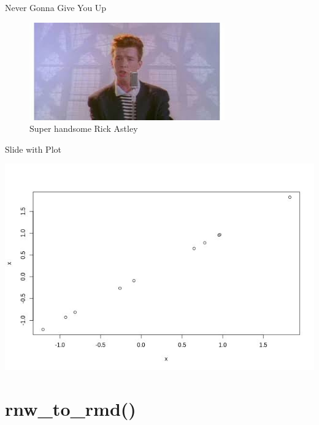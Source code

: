 \documentclass[ignorenonframetext,]{beamer}
\begin{document}
\begin{frame}{Never Gonna Give You Up}

\begin{figure}
\centering
\includegraphics{foto.jpg}
\caption{Super handsome Rick Astley}
\end{figure}

\end{frame}

\begin{frame}{Slide with Plot}

\scriptsize\includegraphics{prezentacja_pakietu_files/figure-beamer/unnamed-chunk-5-1.jpeg}

\end{frame}

\section{rnw\_to\_rmd()}\label{rnw_to_rmd}
\end{document}

